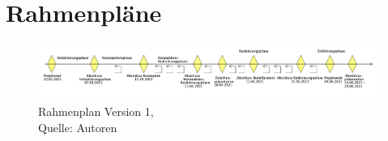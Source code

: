\section{Rahmenpläne}\label{Rahmenplaene}
\begin{figure}[H]
    \centering
   \includegraphics[width=1\textwidth]{images/SoDa_Zeitstrahl_v1.png}
    \caption[SoDa Rahmenplan Version 1]{Rahmenplan Version 1,\\ Quelle: Autoren}
    \label{img: SoDa Rahmenplan_v1}
\end{figure}